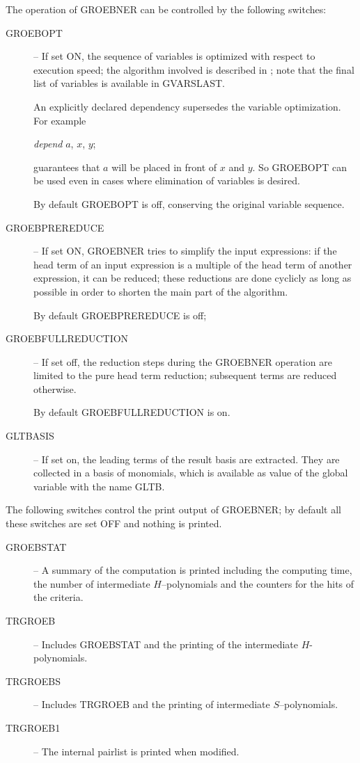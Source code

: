 The operation of GROEBNER can be controlled by the following
switches:
\begin{description}
\item[GROEBOPT] -- If set ON, the sequence of variables is optimized
with respect to execution speed; the algorithm involved is described
in \cite{BOGEK86}; note that the final list of variables is available in
GVARSLAST.

An explicitly declared dependency supersedes the
variable optimization. For example
\begin{center}
{\it depend} $a$, $x$, $y$;
\end{center}
guarantees that $a$ will be placed in front of $x$ and $y$. So
GROEBOPT can be used even in cases where elimination of variables is
desired.

By default GROEBOPT is off, conserving the original variable
sequence.

\item[GROEBPREREDUCE] -- If set ON, GROEBNER tries to simplify the
input expressions: if the head term of an input expression is a
multiple of the head term of another expression, it can be reduced;
these reductions are done cyclicly as long as possible in order to
shorten the main part of the algorithm.

By default GROEBPREREDUCE is off;

\item[GROEBFULLREDUCTION] -- If set off, the reduction steps during
the \linebreak[4] GROEBNER operation are limited to the pure head
term reduction; subsequent terms are reduced otherwise.

By default GROEBFULLREDUCTION is on.

\item[GLTBASIS] -- If set on, the leading terms of the result basis are
extracted. They are collected in a basis of monomials, which is
available as value of the global variable with the name GLTB.
\end{description}
The following switches control the print output of GROEBNER; by
default all these switches are set OFF and nothing is printed.
\begin{description}
\item[GROEBSTAT] -- A summary of the computation is printed
including the computing time, the number of intermediate
$H$--polynomials and the counters for the hits of the criteria.

\item[TRGROEB] -- Includes GROEBSTAT and the printing of the
intermediate $H$-polynomials.

\item[TRGROEBS] -- Includes TRGROEB and the printing of
intermediate $S$--poly\-nomials.

\item[TRGROEB1] -- The internal pairlist is printed when modified.
\end{description}

